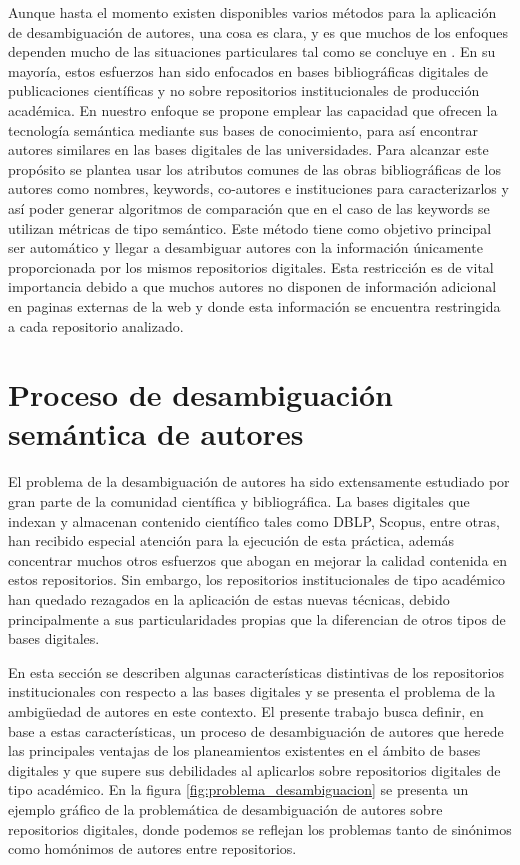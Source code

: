 \documentclass[conference]{IEEEtran}
\begin{document}
Aunque hasta el momento existen disponibles varios métodos para la aplicación de desambiguación de autores, una cosa es clara, y es que muchos de los enfoques dependen mucho de las situaciones particulares tal como se concluye en \cite{Smalheiser:2009:AND:1951529.1951542}. En su mayoría, estos esfuerzos han sido enfocados en bases bibliográficas digitales de publicaciones científicas  y no sobre repositorios institucionales de producción académica.  En nuestro enfoque se propone emplear las capacidad que ofrecen la tecnología semántica mediante sus bases de conocimiento, para así encontrar autores similares en las bases digitales de las universidades. Para alcanzar este propósito se plantea usar los atributos comunes de las obras bibliográficas de los autores como nombres, keywords, co-autores e instituciones para caracterizarlos y así poder generar algoritmos de comparación que en el caso de las keywords se utilizan métricas de tipo semántico. Este método tiene como objetivo principal ser automático y llegar a desambiguar autores con la información únicamente proporcionada por los mismos repositorios digitales. Esta restricción es de vital importancia debido a que muchos autores no disponen de información adicional en paginas externas de la web y donde esta información se encuentra restringida a cada repositorio analizado.


\section{Proceso de desambiguación semántica de autores}
\label{sec:proceso_desambiguacion_semantica}
El problema de la desambiguación de autores ha sido extensamente estudiado por gran parte de la comunidad científica y bibliográfica. La bases digitales que indexan y almacenan contenido científico tales como DBLP, Scopus, entre otras, han recibido especial atención para la ejecución de esta práctica, además concentrar muchos otros esfuerzos que abogan en mejorar la calidad contenida en estos repositorios. Sin embargo, los repositorios institucionales de tipo académico  han quedado rezagados en la aplicación de estas nuevas técnicas, debido principalmente  a sus particularidades propias que la diferencian de otros tipos de bases digitales. 

En esta sección se describen algunas características distintivas de los repositorios institucionales con respecto a las bases digitales y se presenta el problema de la ambigüedad de autores en este contexto. El presente trabajo busca definir, en base a estas características, un proceso de desambiguación de autores que herede las principales ventajas de los planeamientos existentes en el ámbito de bases digitales y que supere sus debilidades al aplicarlos sobre repositorios digitales de  tipo académico. En la figura \ref{fig:problema_desambiguacion} se presenta un ejemplo gráfico de la problemática de desambiguación de autores sobre repositorios digitales, donde podemos se reflejan los problemas tanto de sinónimos como homónimos de autores  entre repositorios.
\end{document}
